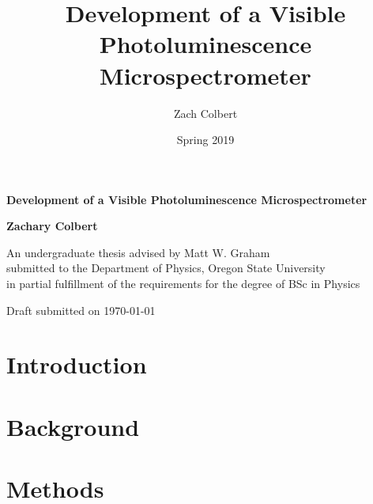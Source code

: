 \documentclass[12pt]{article}
\title{Development of a Visible Photoluminescence Microspectrometer}
\author{Zach Colbert}
\date{Spring 2019}
\renewenvironment{abstract}
 {%
  \global\setbox\abstractbox=\vtop\bgroup
  \begin{center}\bfseries\abstractname\end{center}%
 }
 {\par\egroup}
\begin{document}

  \begin{titlepage}
    \begin{center}
        \vspace*{1cm}
  
        \textbf{Development of a Visible Photoluminescence Microspectrometer}
  
        \vspace{3cm}
  
        \textbf{Zachary Colbert}
  
        \vspace{10cm}
  
        An undergraduate thesis advised by Matt W. Graham \\
        submitted to the Department of Physics, Oregon State University \\
        in partial fulfillment of the requirements for the degree of BSc in Physics
  
        \vfill
  
        Draft submitted on \today
  
    \end{center}
  \end{titlepage}

  

  \tableofcontents
  \listoffigures


  \section{Introduction}
  

  \section{Background}
  

  \section{Methods}
  
\end{document}
